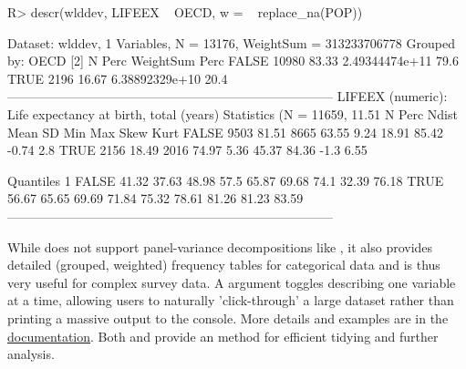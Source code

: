 \documentclass[article]{jss}
\newcommand{\fct}[1]{\code{#1()}}
\begin{document}
%
\begin{Schunk}
\begin{Sinput}
R> descr(wlddev, LIFEEX ~ OECD, w = ~ replace_na(POP))
\end{Sinput}
\begin{Soutput}
Dataset: wlddev, 1 Variables, N = 13176, WeightSum = 313233706778
Grouped by: OECD [2]
           N   Perc       WeightSum  Perc
FALSE  10980  83.33  2.49344474e+11  79.6
TRUE    2196  16.67  6.38892329e+10  20.4
-----------------------------------------------------------------------------
LIFEEX (numeric): Life expectancy at birth, total (years)
Statistics (N = 11659, 11.51% NAs)
          N   Perc  Ndist   Mean    SD    Min    Max   Skew  Kurt
FALSE  9503  81.51   8665  63.55  9.24  18.91  85.42  -0.74   2.8
TRUE   2156  18.49   2016  74.97  5.36  45.37  84.36   -1.3  6.55

Quantiles
          1%     5%    10%    25%    50%    75%    90%    95%    99%
FALSE  41.32  37.63  48.98   57.5  65.87  69.68   74.1  32.39  76.18
TRUE   56.67  65.65  69.69  71.84  75.32  78.61  81.26  81.23  83.59
-----------------------------------------------------------------------------
\end{Soutput}
\end{Schunk}

%
While \fct{descr} does not support panel-variance decompositions like \fct{qsu}, it also provides detailed (grouped, weighted) frequency tables for categorical data and is thus very useful for complex survey data. A  argument toggles describing one variable at a time, allowing users to naturally 'click-through' a large dataset rather than printing a massive output to the console. More details and examples are in the \href{https://sebkrantz.github.io/collapse/reference/descr.html}{documentation}. Both \fct{qsu} and \fct{descr} provide an  method for efficient tidying and further analysis. \newline
\end{document}
